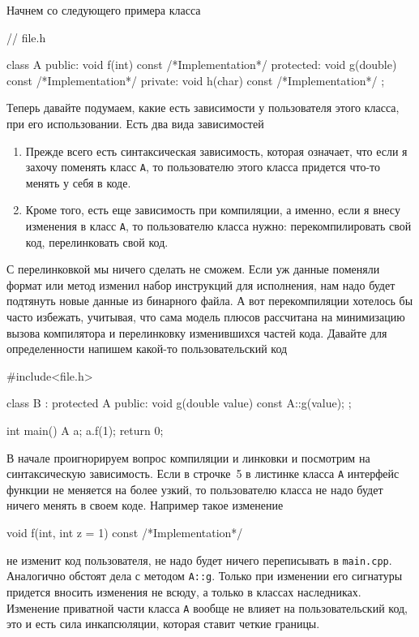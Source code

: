 Начнем со следующего примера класса
\begin{cppcode}
// file.h

class A {
public:
  void f(int) const {
    /*Implementation*/
  }
protected:
  void g(double) const {
    /*Implementation*/
  }
private:
  void h(char) const {
    /*Implementation*/
  }
};
\end{cppcode}
Теперь давайте подумаем, какие есть зависимости у пользователя этого класса, при его использовании.
Есть два вида зависимостей
\begin{enumerate}
\item Прежде всего есть синтаксическая зависимость, которая означает, что если я захочу поменять класс \verb"A", то пользователю этого класса придется что-то менять у себя в коде.

\item Кроме того, есть еще зависимость при компиляции, а именно, если я внесу изменения в класс \verb"A", то пользователю класса нужно: перекомпилировать свой код, перелинковать свой код.
\end{enumerate}
С перелинковкой мы ничего сделать не сможем.
Если уж данные поменяли формат или метод изменил набор инструкций для исполнения, нам надо будет подтянуть новые данные из бинарного файла.
А вот перекомпиляции хотелось бы часто избежать, учитывая, что сама модель плюсов рассчитана на минимизацию вызова компилятора и перелинковку изменившихся частей кода.
Давайте для определенности напишем какой-то пользовательский код
\begin{cppcode}
#include<file.h>

class B : protected A {
public:
  void g(double value) const {
    A::g(value);
  }
};

int main() {
  A a;
  a.f(1);
  return 0;
}
\end{cppcode}
В начале проигнорируем вопрос компиляции и линковки и посмотрим на синтаксическую зависимость.
Если в строчке~5 в листинке класса \verb"A" интерфейс функции не меняется на более узкий, то пользователю класса не надо будет ничего менять в своем коде.
Например такое изменение
\begin{cppcode}
void f(int, int z = 1) const { /*Implementation*/ }
\end{cppcode}
не изменит код пользователя, не надо будет ничего переписывать в \verb"main.cpp".
Аналогично обстоят дела с методом \verb"A::g".
Только при изменении его сигнатуры придется вносить изменения не всюду, а только в классах наследниках.
Изменение приватной части класса \verb"A" вообще не влияет на пользовательский код, это и есть сила инкапсюляции, которая ставит четкие границы.


